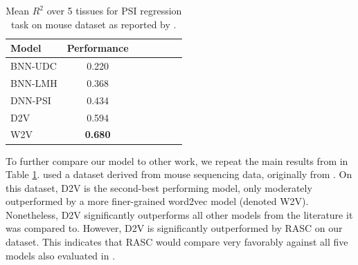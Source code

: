 
\begin{table}[h]
	\centering
	\begin{tabular}{ l c c c c c c} 
		\hline
		Model & Performance \\
		\hline
		BNN-UDC \cite{jha} & 0.220\\
		BNN-LMH \cite{jha}& 0.368\\
		DNN-PSI \cite{jha} & 0.434\\
		D2V \cite{d2vsplicing} & 0.594\\
		W2V \cite{d2vsplicing} & \textbf{0.680}\\
		\hline
	\end{tabular}
	\caption{Mean $R^2$ over 5 tissues for PSI regression task on mouse dataset as reported by \cite{d2vsplicing}. 
	}
	\label{table:ieee_regression}
\end{table}

To further compare our model to other work, we repeat the main results from \cite{d2vsplicing} in Table \ref{table:ieee_regression}. \cite{d2vsplicing} used a dataset derived from mouse sequencing data, originally from \cite{jha}. On this dataset, D2V is the second-best performing model, only moderately outperformed by a more finer-grained word2vec model (denoted W2V). Nonetheless, D2V significantly outperforms all other models from the literature it was compared to. 
However, D2V is significantly outperformed by RASC on our dataset. This indicates that RASC would compare very favorably against all five models also evaluated in \cite{d2vsplicing}. 



